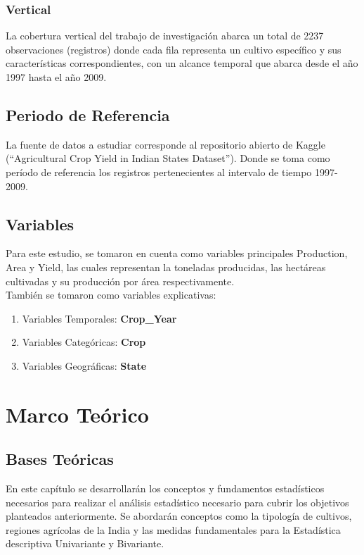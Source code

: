 \documentclass[oneside,11pt]{Latex/Classes/PhDthesisPSnPDF}
\begin{document}
\subsection{Vertical}

La cobertura vertical del trabajo de investigación abarca un total de
2237 observaciones (registros) donde cada fila representa un cultivo
específico y sus características correspondientes, con un alcance
temporal que abarca desde el año 1997 hasta el año 2009.

\section{Periodo de Referencia}

La fuente de datos a estudiar corresponde al repositorio abierto de
Kaggle (``Agricultural Crop Yield in Indian States Dataset''). Donde se
toma como período de referencia los registros pertenecientes al
intervalo de tiempo 1997-2009.

\section{Variables}

Para este estudio, se tomaron en cuenta como variables principales
Production, Area y Yield, las cuales representan la toneladas
producidas, las hectáreas cultivadas y su producción por área
respectivamente.\\

También se tomaron como variables explicativas:

\begin{enumerate}
  \item Variables Temporales: \textbf{Crop\_Year}
  \item Variables Categóricas: \textbf{Crop}
  \item Variables Geográficas: \textbf{State}
\end{enumerate}

\chapter{Marco Teórico}

\section{Bases Teóricas}

En este capítulo se desarrollarán los conceptos y fundamentos
estadísticos necesarios para realizar el análisis estadístico necesario
para cubrir los objetivos planteados anteriormente. Se abordarán
conceptos como la tipología de cultivos, regiones agrícolas de la India
y las medidas fundamentales para la Estadística descriptiva Univariante
y Bivariante.
\end{document}
